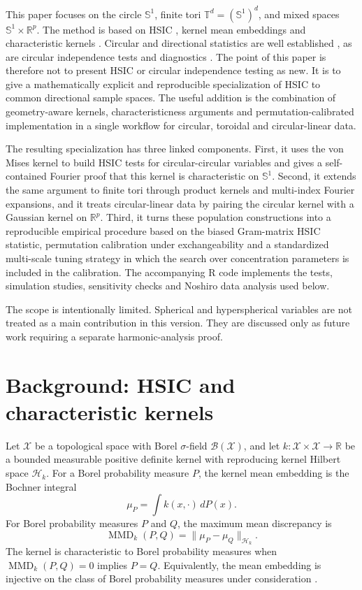 \documentclass[11pt]{article}
\newcommand{\Sone}{\mathbb S^1}
\newcommand{\Td}{\mathbb T^d}
\newcommand{\R}{\mathbb R}
\newcommand{\MMD}{\operatorname{MMD}}
\begin{document}
This paper focuses on the circle \(\Sone\), finite tori \(\Td=(\Sone)^d\), and mixed spaces \(\Sone\times\R^p\).  The method is based on HSIC \citep{gretton2005hsic,gretton2008kernel}, kernel mean embeddings and characteristic kernels \citep{sriperumbudur2010hilbert,sriperumbudur2011universality}.  Circular and directional statistics are well established \citep{mardia1975directional,mardiajupp2000directional,fisher1993circular,ley2017modern,pewsey2021recent}, as are circular independence tests and diagnostics \citep{jammalamadaka2001topics,shieh1994weighted,garciaportugues2024trigonometric}.  The point of this paper is therefore not to present HSIC or circular independence testing as new.  It is to give a mathematically explicit and reproducible specialization of HSIC to common directional sample spaces.  The useful addition is the combination of geometry-aware kernels, characteristicness arguments and permutation-calibrated implementation in a single workflow for circular, toroidal and circular-linear data.

The resulting specialization has three linked components.  First, it uses the von Mises kernel to build HSIC tests for circular-circular variables and gives a self-contained Fourier proof that this kernel is characteristic on \(\Sone\).  Second, it extends the same argument to finite tori through product kernels and multi-index Fourier expansions, and it treats circular-linear data by pairing the circular kernel with a Gaussian kernel on \(\R^p\).  Third, it turns these population constructions into a reproducible empirical procedure based on the biased Gram-matrix HSIC statistic, permutation calibration under exchangeability and a standardized multi-scale tuning strategy in which the search over concentration parameters is included in the calibration.  The accompanying R code implements the tests, simulation studies, sensitivity checks and Noshiro data analysis used below.

The scope is intentionally limited.  Spherical and hyperspherical variables are not treated as a main contribution in this version.  They are discussed only as future work requiring a separate harmonic-analysis proof.

\section{Background: HSIC and characteristic kernels}

Let \(\mathcal X\) be a topological space with Borel \(\sigma\)-field \(\mathcal B(\mathcal X)\), and let \(k:\mathcal X\times\mathcal X\to\mathbb R\) be a bounded measurable positive definite kernel with reproducing kernel Hilbert space \(\mathcal H_k\).  For a Borel probability measure \(P\), the kernel mean embedding is the Bochner integral
\[
  \mu_P=\int k(x,\cdot)\,dP(x).
\]
For Borel probability measures \(P\) and \(Q\), the maximum mean discrepancy is
\[
  \MMD_k(P,Q)=\|\mu_P-\mu_Q\|_{\mathcal H_k}.
\]
The kernel is characteristic to Borel probability measures when \(\MMD_k(P,Q)=0\) implies \(P=Q\).  Equivalently, the mean embedding is injective on the class of Borel probability measures under consideration \citep{sriperumbudur2010hilbert,sriperumbudur2011universality}.
\end{document}
